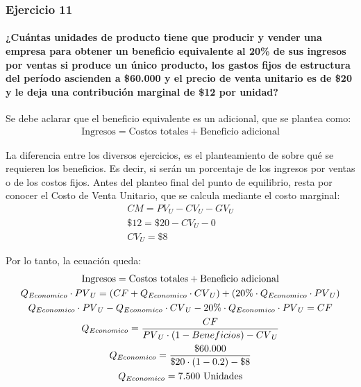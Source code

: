 \documentclass[12pt,a4paper]{article}
\newcommand{\consigna}[1]{\paragraph{\indent #1} \hspace{0pt}}
\begin{document}
    	\hrulefill
        
    	\subsubsection{Ejercicio 11}
        
        \consigna{¿Cuántas unidades de producto tiene que producir y vender una empresa para obtener un beneficio equivalente al 20\% de sus ingresos por ventas si produce un único producto, los gastos fijos de estructura del período ascienden a \$60.000 y el precio de venta unitario es de \$20 y le deja una contribución marginal de \$12 por unidad?}
        
        \par{
        	Se debe aclarar que el beneficio equivalente es un adicional, que se plantea como:
        	}
		\begin{align}
        	\text{Ingresos} = \text{Costos totales} + \text{Beneficio adicional}
            \label{Beneficios_Punto_de_equilibrio_economico}
		\end{align}
        \par{
        	La diferencia entre los diversos ejercicios, es el planteamiento de sobre qué se requieren los beneficios.
            Es decir, si serán un porcentaje de los ingresos por ventas o de los costos fijos.
            Antes del planteo final del punto de equilibrio, resta por conocer el Costo de Venta Unitario, que se calcula mediante el costo marginal:
            }
            \begin{gather*}
            	{CM} = {PV}_{U} - {CV}_{U} - {GV}_{U} \\
                \$12 = \$20 - {CV}_{U} - 0 \\
                {CV}_{U} = \$8
			\end{gather*}
            \par{
            	Por lo tanto, la ecuación queda:
                }
            \begin{gather}
            	\text{Ingresos} = \text{Costos totales} + \text{Beneficio adicional} \notag \\
                Q_{Economico} \cdot {PV}_{U} = ( CF + Q_{Economico} \cdot {CV}_{U} ) + ( 20\% \cdot Q_{Economico} \cdot {PV}_{U} ) \notag \\
                Q_{Economico} \cdot {PV}_{U} - Q_{Economico} \cdot {CV}_{U} - 20\% \cdot Q_{Economico} \cdot {PV}_{U}= CF \notag \\
                Q_{Economico} = \dfrac{CF}{ {PV}_{U} \cdot ( 1 - Beneficios ) - {CV}_{U} } \\
                Q_{Economico} = \dfrac{\$60{.}000}{ \$20 \cdot ( 1 - 0.2 ) - \$8 } \notag \\
                Q_{Economico} = 7{.}500 \text{ Unidades} \notag
            \end{gather}
        
\end{document}

